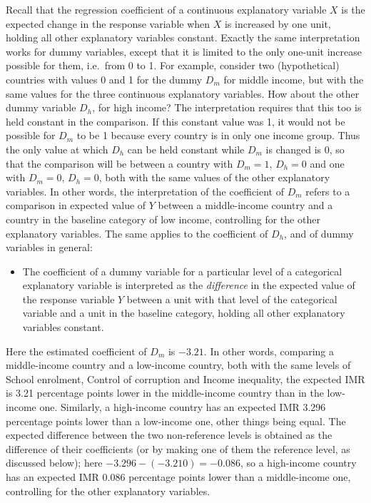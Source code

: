 \documentclass[11pt,a4paper,openany]{book}
\providecommand{\tightlist}{%
  \setlength{\itemsep}{0pt}\setlength{\parskip}{0pt}}
\begin{document}
Recall that the regression coefficient of a continuous explanatory
variable \(X\) is the expected change in the response variable when
\(X\) is increased by one unit, holding all other explanatory variables
constant. Exactly the same interpretation works for dummy variables,
except that it is limited to the only one-unit increase possible for
them, i.e.~from 0 to 1. For example, consider two (hypothetical)
countries with values 0 and 1 for the dummy \(D_{m}\) for middle income,
but with the same values for the three continuous explanatory variables.
How about the other dummy variable \(D_{h}\), for high income? The
interpretation requires that this too is held constant in the
comparison. If this constant value was 1, it would not be possible for
\(D_{m}\) to be 1 because every country is in only one income group.
Thus the only value at which \(D_{h}\) can be held constant while
\(D_{m}\) is changed is 0, so that the comparison will be between a
country with \(D_{m}=1, \, D_{h}=0\) and one with
\(D_{m}=0,\, D_{h}=0\), both with the same values of the other
explanatory variables. In other words, the interpretation of the
coefficient of \(D_{m}\) refers to a comparison in expected value of
\(Y\) between a middle-income country and a country in the baseline
category of low income, controlling for the other explanatory variables.
The same applies to the coefficient of \(D_{h}\), and of dummy variables
in general:

\begin{itemize}
\tightlist
\item
  The coefficient of a dummy variable for a particular level of a
  categorical explanatory variable is interpreted as the
  \emph{difference} in the expected value of the response variable \(Y\)
  between a unit with that level of the categorical variable and a unit
  in the baseline category, holding all other explanatory variables
  constant.
\end{itemize}

Here the estimated coefficient of \(D_{m}\) is \(-3.21\). In other
words, comparing a middle-income country and a low-income country, both
with the same levels of School enrolment, Control of corruption and
Income inequality, the expected IMR is 3.21 percentage points lower in
the middle-income country than in the low-income one. Similarly, a
high-income country has an expected IMR 3.296 percentage points lower
than a low-income one, other things being equal. The expected difference
between the two non-reference levels is obtained as the difference of
their coefficients (or by making one of them the reference level, as
discussed below); here \(-3.296-(-3.210)=-0.086\), so a high-income
country has an expected IMR 0.086 percentage points lower than a
middle-income one, controlling for the other explanatory variables.
\end{document}
